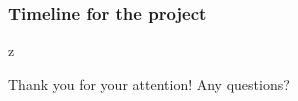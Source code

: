 \documentclass[10pt,xcolor=table]{beamer}
\begin{document}
\begin{frame}
  \frametitle{Timeline for the project}
\begin{table}[tp]
  \caption{Timeline for the project.}
  \label{table:timeline}
  \begin{adjustwidth}{-0.15in}{0.0in}z
    \centering
    \footnotesize
  \end{adjustwidth}
\end{table}  
\end{frame}

\begin{frame}{\Large Thank you for your attention!}
  \centering \Large Any questions?
\end{frame}
\end{document}
